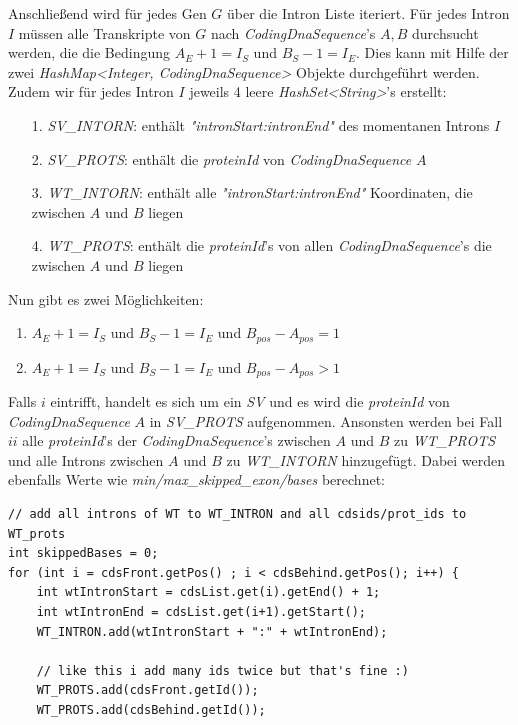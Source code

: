 \documentclass[12pt]{article}
\begin{document}
\begin{enumerate}
    Anschlie\ss end wird für jedes Gen $G$ über die Intron Liste iteriert. Für jedes Intron $I$
    müssen alle Transkripte von $G$ nach \textit{CodingDnaSequence}'s $A, B$ durchsucht werden, die
    die Bedingung $A_{E} + 1 = I_{S}$ und $B_{S} - 1 = I_{E}$. Dies kann mit Hilfe der zwei 
    \textit{HashMap<Integer, CodingDnaSequence>} Objekte durchgeführt werden.
    Zudem wir für jedes Intron $I$ jeweils 4 leere \textit{HashSet<String>}'s erstellt:
    \begin{enumerate}
        \item[1.] \textit{SV\_INTORN}: enthält \textit{"intronStart:intronEnd"} des momentanen Introns $I$
        \item[2.] \textit{SV\_PROTS}: enthält die \textit{proteinId} von \textit{CodingDnaSequence} $A$
            \item[3.] \textit{WT\_INTORN}: enthält alle \textit{"intronStart:intronEnd"} Koordinaten, die zwischen $A$ und $B$ liegen
        \item[4.] \textit{WT\_PROTS}: enthält die \textit{proteinId}'s von allen \textit{CodingDnaSequence}'s die zwischen $A$ und $B$ liegen
    \end{enumerate}
    Nun gibt es zwei Möglichkeiten:
    \begin{enumerate}
        \item  $A_{E} + 1 = I_{S}$ und $B_{S} - 1 = I_{E}$ und $B_{pos} - A_{pos} = 1$
        \item  $A_{E} + 1 = I_{S}$ und $B_{S} - 1 = I_{E}$ und $B_{pos} - A_{pos} > 1$
    \end{enumerate}

    Falls $i$ eintrifft, handelt es sich um ein \textit{SV} und es wird die \textit{proteinId} von \textit{CodingDnaSequence} $A$
    in \textit{SV\_PROTS} aufgenommen.
    Ansonsten werden bei Fall $ii$ alle \textit{proteinId}'s der \textit{CodingDnaSequence}'s zwischen $A$ und $B$ zu 
    \textit{WT\_PROTS} und alle Introns zwischen $A$ und $B$ zu \textit{WT\_INTORN} hinzugefügt.
    Dabei werden ebenfalls Werte wie \textit{min/max\_skipped\_exon/bases} berechnet:
    \begin{verbatim}
// add all introns of WT to WT_INTRON and all cdsids/prot_ids to WT_prots
int skippedBases = 0;
for (int i = cdsFront.getPos() ; i < cdsBehind.getPos(); i++) {
    int wtIntronStart = cdsList.get(i).getEnd() + 1;
    int wtIntronEnd = cdsList.get(i+1).getStart();
    WT_INTRON.add(wtIntronStart + ":" + wtIntronEnd);

    // like this i add many ids twice but that's fine :)
    WT_PROTS.add(cdsFront.getId());
    WT_PROTS.add(cdsBehind.getId());


\end{verbatim}
\end{enumerate}
\end{document}
